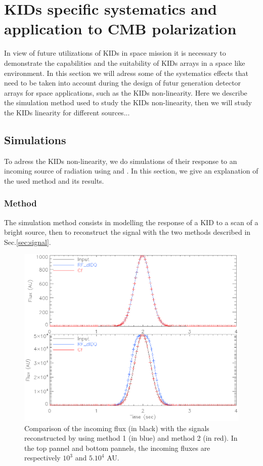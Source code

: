 
\section{KIDs specific systematics and application to CMB polarization}

In view of future utilizations of KIDs in space mission it is necessary to demonstrate the capabilities and the suitability of KIDs arrays in a space like environment. In this section we will adress some of the systematics effects that need to be taken into account during the design of futur generation detector arrays for space applications, such as the KIDs non-linearity. Here we describe the simulation method used to study the KIDs non-linearity, then we will study the KIDs linearity for different sources... \\

\subsection{Simulations}
To adress the KIDs non-linearity, we do simulations of their response to an incoming source of radiation using \rf and \cf. In this section, we give an explanation of the used method and its results.

	\subsubsection{Method}
	
The simulation method consists in modelling the response of a KID to a scan of a bright source, then to reconstruct the signal with the two methods described  in Sec.\ref{sec:signal}.

\begin{figure}[h]
\includegraphics[scale=0.54]{Figures/planets.eps}
\caption{Comparison of the incoming flux (in black) with the signals reconstructed by using method 1 (in blue) and method 2 (in red). In the top pannel and bottom pannels, the incoming fluxes are respectively $10^{3}$ and $5.10^{4}$ AU.}
\label{planet}
\end{figure}

